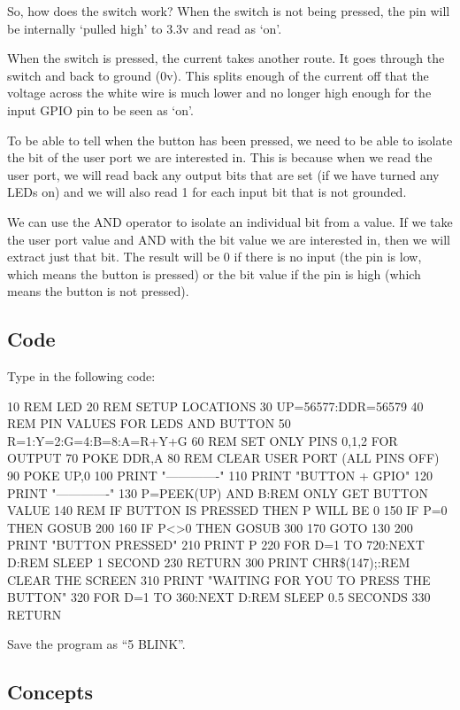 So, how does the switch work?  When the switch is not being pressed, the pin will be internally `pulled high' to 3.3v and read as `on'.

When the switch is pressed, the current takes another route.  It goes through the switch and back to ground (0v).  This splits enough of the current off that the voltage across the white wire is much lower and no longer high enough for the input GPIO pin to be seen as `on'.

To be able to tell when the button has been pressed, we need to be able to isolate the bit of the user port we are interested in.  This is because when we read the user port, we will read back any output bits that are set (if we have turned any LEDs on) and we will also read 1 for each input bit that is not grounded.

We can use the AND operator to isolate an individual bit from a value.  If we take the user port value and AND with the bit value we are interested in, then we will extract just that bit.  The result will be 0 if there is no input (the pin is low, which means the button is pressed) or the bit value if the pin is high (which means the button is not pressed).

\subsection*{Code}

Type in the following code:
\begin{basic}
10 REM LED
20 REM SETUP LOCATIONS
30 UP=56577:DDR=56579
40 REM PIN VALUES FOR LEDS AND BUTTON
50 R=1:Y=2:G=4:B=8:A=R+Y+G
60 REM SET ONLY PINS 0,1,2 FOR OUTPUT
70 POKE DDR,A
80 REM CLEAR USER PORT (ALL PINS OFF)
90 POKE UP,0
100 PRINT "-------------"
110 PRINT "BUTTON + GPIO"
120 PRINT "-------------"
130 P=PEEK(UP) AND B:REM ONLY GET BUTTON VALUE
140 REM IF BUTTON IS PRESSED THEN P WILL BE 0
150 IF P=0 THEN GOSUB 200
160 IF P<>0 THEN GOSUB 300
170 GOTO 130
200 PRINT "BUTTON PRESSED"
210 PRINT P
220 FOR D=1 TO 720:NEXT D:REM SLEEP 1 SECOND
230 RETURN
300 PRINT CHR\$(147);:REM CLEAR THE SCREEN
310 PRINT "WAITING FOR YOU TO PRESS THE BUTTON"
320 FOR D=1 TO 360:NEXT D:REM SLEEP 0.5 SECONDS
330 RETURN
\end{basic}

Save the program as ``5 BLINK''.

\subsection*{Concepts}

